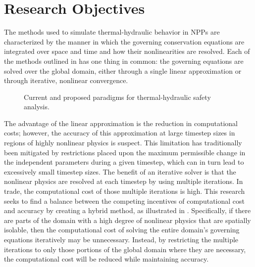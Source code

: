 \section{Research Objectives}
\label{sect:researchObjectives}

The methods used to simulate thermal-hydraulic behavior in NPPs are characterized by the manner in which the governing conservation equations are integrated over space and time and how their nonlinearities are resolved.
Each of the methods outlined in  has one thing in common: the governing equations are solved over the global domain, either through a single linear approximation or through iterative, nonlinear convergence.

\begin{figure}[ht!]
\centering

\caption{Current and proposed paradigms for thermal-hydraulic safety analysis.}
\label{fig:my_diagram}
\end{figure}

The advantage of the linear approximation is the reduction in computational costs; however, the accuracy of this approximation at large timestep sizes in regions of highly nonlinear physics is suspect.
This limitation has traditionally been mitigated by restrictions placed upon the maximum permissible change in the independent parameters during a given timestep, which can in turn lead to excessively small timestep sizes.
The benefit of an iterative solver is that the nonlinear physics are resolved at each timestep by using multiple iterations.
In trade, the computational cost of those multiple iterations is high.
This research seeks to find a balance between the competing incentives of computational cost and accuracy by creating a hybrid method, as illustrated in .
Specifically, if there are parts of the domain with a high degree of nonlinear physics that are spatially isolable, then the computational cost of solving the entire domain's governing equations iteratively may be unnecessary.
Instead, by restricting the multiple iterations to only those portions of the global domain where they are necessary, the computational cost will be reduced while maintaining accuracy. 

